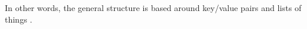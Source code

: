 In other words, the general structure is based around key/value pairs and lists of things \cite{Anderson.2010.Buch}.






%
